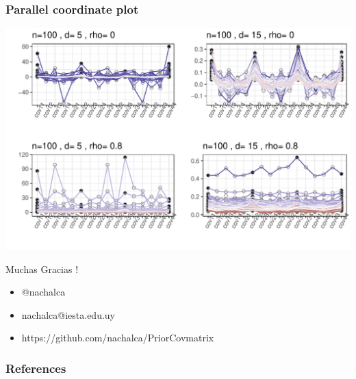 \documentclass[9pt]{beamer}\usepackage[]{graphicx}\usepackage[]{color}
\makeatletter
\def\maxwidth{ %
  \ifdim\Gin@nat@width>\linewidth
    \linewidth
  \else
    \Gin@nat@width
  \fi
}
\newenvironment{knitrout}{}{} %
\makeatother
\begin{document}
\begin{frame}[fragile]
\frametitle{ Parallel coordinate plot }
\begin{knitrout}
\color{fgcolor}
\includegraphics[width=\maxwidth]{figure/unnamed-chunk-8-1} 

\end{knitrout}

\end{frame}

\begin{frame}
\begin{center} Muchas Gracias ! \end{center}

\vspace{1.5cm}
\begin{itemize}
  \item @nachalca
  \item nachalca@iesta.edu.uy
  \item https://github.com/nachalca/PriorCovmatrix
\end{itemize}

\end{frame}

\begin{frame}
\frametitle{References}
        
\small{   }
\end{frame}
\end{document}

